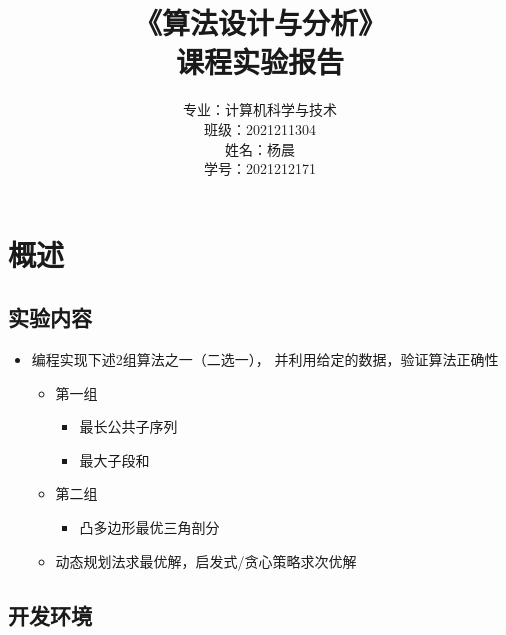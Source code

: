 \documentclass[lang=cn,11pt,a4paper]{elegantpaper}
\title{《算法设计与分析》\\课程实验报告}
\author{
\huge 专业：计算机科学与技术 \\[10pt]
\huge 班级：2021211304 \\[10pt]
\huge 姓名：杨晨 \\[10pt]
\huge 学号：2021212171
}
\date{}
\begin{document}
\maketitle

\clearpage



\section{概述}

\subsection{实验内容}

\begin{itemize}
    \item 编程实现下述2组算法之一（二选一）， 并利用给定的数据，验证算法正确性
    \begin{itemize}
        \item 第一组
        \begin{itemize}
            \item 最长公共子序列
            \item 最大子段和
        \end{itemize}
        \item 第二组
        \begin{itemize}
            \item 凸多边形最优三角剖分
        \end{itemize}
        \item 动态规划法求最优解，启发式/贪心策略求次优解
    \end{itemize}
\end{itemize}

\subsection{开发环境}
\end{document}

